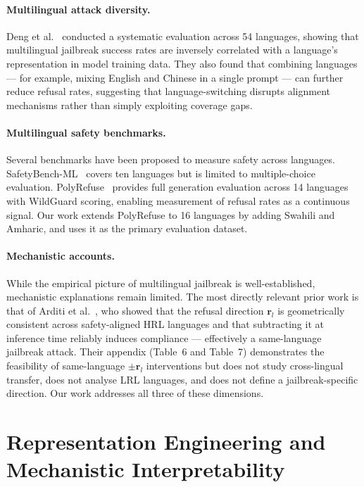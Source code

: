 \paragraph{Multilingual attack diversity.}
Deng et al.~\citeyearpar{deng2023multilingual} conducted a systematic evaluation across 54 languages, showing that multilingual jailbreak success rates are inversely correlated with a language's representation in model training data. They also found that combining languages — for example, mixing English and Chinese in a single prompt — can further reduce refusal rates, suggesting that language-switching disrupts alignment mechanisms rather than simply exploiting coverage gaps.

\paragraph{Multilingual safety benchmarks.}
Several benchmarks have been proposed to measure safety across languages. SafetyBench-ML~\citep{zhang2023safetybench} covers ten languages but is limited to multiple-choice evaluation. PolyRefuse~\citep{polyrefuse} provides full generation evaluation across 14 languages with WildGuard scoring, enabling measurement of refusal rates as a continuous signal. Our work extends PolyRefuse to 16 languages by adding Swahili and Amharic, and uses it as the primary evaluation dataset.

\paragraph{Mechanistic accounts.}
While the empirical picture of multilingual jailbreak is well-established, mechanistic explanations remain limited. The most directly relevant prior work is that of Arditi et al.~\citeyearpar{arditi2024refusal}, who showed that the refusal direction $\mathbf{r}_l$ is geometrically consistent across safety-aligned HRL languages and that subtracting it at inference time reliably induces compliance — effectively a same-language jailbreak attack. Their appendix (Table~6 and Table~7) demonstrates the feasibility of same-language $\pm \mathbf{r}_l$ interventions but does not study cross-lingual transfer, does not analyse LRL languages, and does not define a jailbreak-specific direction. Our work addresses all three of these dimensions.

\section{Representation Engineering and Mechanistic Interpretability}


